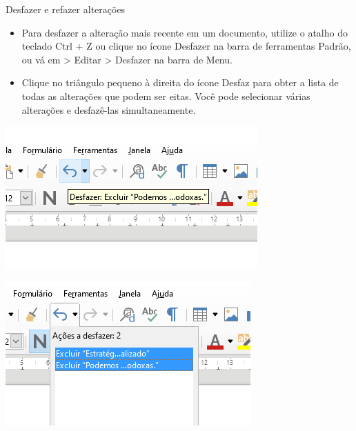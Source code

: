 \begin{frame}{Desfazer e refazer alterações}
	\begin{block}{}
		\begin{itemize}
			\item Para desfazer a alteração mais recente em um documento, utilize o atalho do teclado Ctrl + Z ou clique no ícone Desfazer na barra de ferramentas Padrão, ou vá em > Editar > Desfazer na barra de Menu.
			\item Clique no triângulo pequeno à direita do ícone Desfaz para obter a lista de todas as alterações que podem ser eitas. Você pode selecionar várias alterações e desfazê-las simultaneamente.
		\end{itemize}
	\end{block}

	\begin{minipage}{0.49\linewidth}
		\centering
		\includegraphics[width=1\linewidth]{Figuras/Ch04/fig38}
	\end{minipage}\hfill
	\begin{minipage}{0.49\linewidth}
		\centering
		\includegraphics[width=1\linewidth]{Figuras/Ch04/fig39}
	\end{minipage}
\end{frame}


